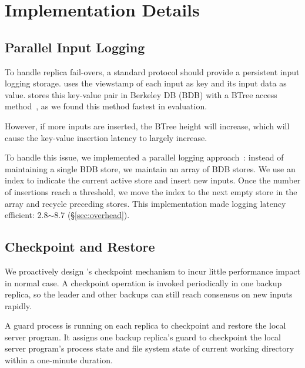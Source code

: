 \section{Implementation Details} \label{sec:impl}


\subsection{Parallel Input Logging} \label{sec:logging}

To handle replica fail-overs, a standard \paxos protocol should provide a 
persistent input logging storage. \xxx uses the \paxos viewstamp of each input 
as key and its input data as value. \xxx stores this key-value pair in 
Berkeley DB (BDB) with a BTree access method~\cite{berkeleydb}, as we 
found this method fastest in evaluation.

However, if more inputs are inserted, the BTree height 
will increase, which will cause the key-value insertion latency to 
largely increase.

To handle this issue, we implemented a parallel logging 
approach~\cite{Bessani:usenix13}: instead of maintaining a 
single BDB store, we maintain an array of BDB stores. We use an index to 
indicate the current active store and insert new inputs. Once the number of 
insertions reach a threshold, we move the index to the next empty store in the 
array and recycle preceding stores. This implementation made 
\xxx logging latency efficient: 2.8$\sim$8.7 \us (\S\ref{sec:overhead}).

\subsection{Checkpoint and Restore} \label{sec:checkpoint}

We proactively design \xxx's checkpoint mechanism to incur little performance 
impact in normal case. A checkpoint operation is invoked periodically 
in one backup replica, so the leader and other backups can still reach 
consensus on new inputs rapidly.

A guard process is running on each replica to checkpoint and restore the 
local server program. It assigns one backup 
replica's guard to checkpoint the local server program's process state and file 
system state of current working directory within a one-minute duration.

